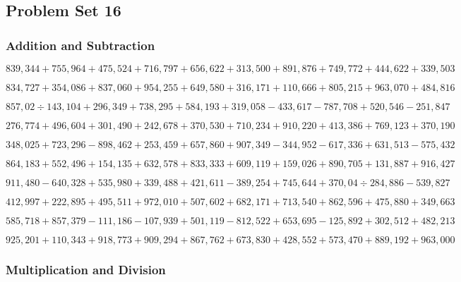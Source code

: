 \hypertarget{problem-set-16-5}{%
\subsection{Problem Set 16}\label{problem-set-16-5}}

\hypertarget{addition-and-subtraction-321}{%
\subsubsection{Addition and
Subtraction}\label{addition-and-subtraction-321}}

\(839,344+755,964+475,524+716,797+656,622+313,500+891,876+749,772+444,622+ 339,503\)

\(834,727+354,086+837,060+954,255+649,580+316,171+110,666+805,215+963,070+484,816\)

\(857,02÷143,104+296,349+738,295+584,193+319,058-433,617-787,708+520,546-251,847\)

\(276,774+496,604+301,490+242,678+370,530+710,234+910,220+413,386+769,123+370,190\)

\(348,025+723,296-898,462+253,459+657,860+907,349-344,952-617,336+631,513-575,432\)

\(864,183+552,496+154,135+632,578+833,333+609,119+159,026+890,705+131,887+916,427\)

\(911,480-640,328+535,980+339,488+421,611-389,254+745,644+370,04÷284,886-539,827\)

\(412,997+222,895+495,511+972,010+507,602+682,171+713,540+862,596+475,880+349,663\)

\(585,718+857,379-111,186-107,939+501,119-812,522+653,695-125,892+302,512+482,213\)

\(925,201+110,343+918,773+909,294+867,762+673,830+428,552+573,470+889,192+963,000\)

\hypertarget{multiplication-and-division-320}{%
\subsubsection{Multiplication and
Division}\label{multiplication-and-division-320}}

